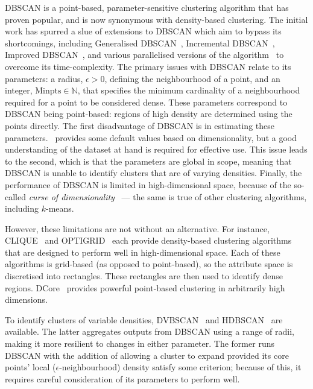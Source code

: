 DBSCAN is a point-based, parameter-sensitive clustering algorithm that has
proven popular, and is now synonymous with density-based clustering. The initial
work has spurred a slue of extensions to DBSCAN which aim to bypass its
shortcomings, including Generalised DBSCAN~\cite{Sander1998}, Incremental
DBSCAN~\cite{Bakr2015,Ester1998}, Improved DBSCAN~\cite{Borah2004}, and various
parallelised versions of the algorithm~\cite{Bohm2009,He2011,Loh2014,Xu2002} to
overcome its time-complexity. The primary issues with DBSCAN relate to its
parameters: a radius, \(\epsilon > 0\), defining the neighbourhood of a point,
and an integer, \(\text{Minpts} \in \mathbb N\), that specifies the minimum cardinality
of a neighbourhood required for a point to be considered dense. These parameters
correspond to DBSCAN being point-based: regions of high density are determined
using the points directly. The first disadvantage of DBSCAN is in estimating
these parameters.~\cite{Ester1996} provides some default values based on
dimensionality, but a good understanding of the dataset at hand is required for
effective use. This issue leads to the second, which is that the parameters are
global in scope, meaning that DBSCAN is unable to identify clusters that are of
varying densities. Finally, the performance of DBSCAN is limited in
high-dimensional space, because of the so-called \emph{curse of
dimensionality}~\cite{Keogh2017} --- the same is true of other clustering
algorithms, including \(k\)-means.

However, these limitations are not without an alternative. For instance,
CLIQUE~\cite{Agrawal1998} and OPTIGRID~\cite{Hinneburg1999} each provide
density-based clustering algorithms that are designed to perform well in
high-dimensional space. Each of these algorithms is grid-based (as opposed to
point-based), so the attribute space is discretised into rectangles. These
rectangles are then used to identify dense regions. DCore~\cite{Chen2018}
provides powerful point-based clustering in arbitrarily high dimensions.

To identify clusters of variable densities, DVBSCAN~\cite{Ram2010} and
HDBSCAN~\cite{Campello2013} are available. The latter aggregates outputs from
DBSCAN using a range of radii, making it more resilient to changes in either
parameter. The former runs DBSCAN with the addition of allowing a cluster to
expand provided its core points' local (\(\epsilon\)-neighbourhood) density
satisfy some criterion; because of this, it requires careful consideration of
its parameters to perform well.

